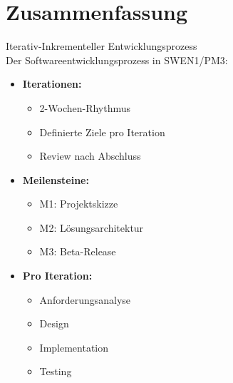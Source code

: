 \section{Zusammenfassung}

\begin{concept}{Iterativ-Inkrementeller Entwicklungsprozess}\\
Der Softwareentwicklungsprozess in SWEN1/PM3:
\begin{itemize}
    \item \textbf{Iterationen:}
    \begin{itemize}
        \item 2-Wochen-Rhythmus
        \item Definierte Ziele pro Iteration
        \item Review nach Abschluss
    \end{itemize}
    \item \textbf{Meilensteine:}
    \begin{itemize}
        \item M1: Projektskizze
        \item M2: Lösungsarchitektur
        \item M3: Beta-Release
    \end{itemize}
    \item \textbf{Pro Iteration:}
    \begin{itemize}
        \item Anforderungsanalyse
        \item Design
        \item Implementation
        \item Testing
    \end{itemize}
\end{itemize}
\end{concept}

